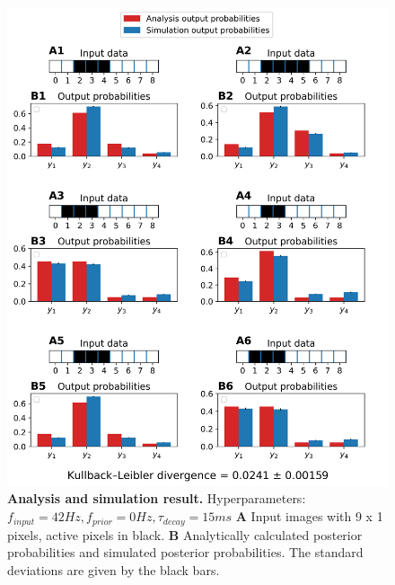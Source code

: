 \begin{figure}
  \includegraphics[width=\linewidth]{figures/1D/1D_42_0_15.png}
  \caption{\textbf{Analysis and simulation result. } Hyperparameters: $f_{input} = 42 Hz, f_{prior} = 0 Hz, \tau_{decay} = 15 ms$ \textbf{A} Input images with 9 x 1 pixels, active pixels in black. \textbf{B} Analytically calculated posterior probabilities and simulated posterior probabilities. The standard deviations are given by the black bars.}
  \label{fig:1D_42_0_15}
\end{figure}

